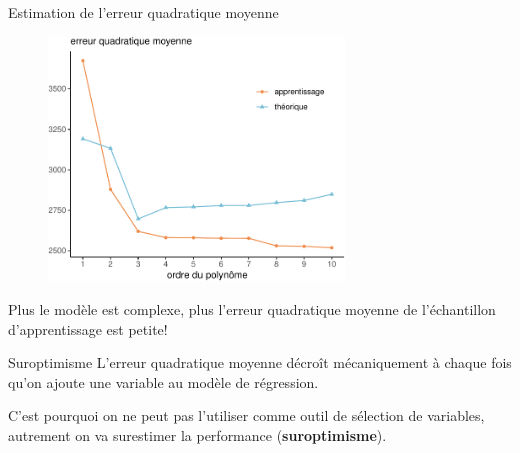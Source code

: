\documentclass[
  ignorenonframetext,
]{beamer}
\begin{document}
\begin{frame}{Estimation de l'erreur quadratique moyenne}
\protect\hypertarget{estimation-de-lerreur-quadratique-moyenne}{}
\begin{figure}

{\centering \includegraphics[width=0.7\textwidth,height=\textheight]{MATH60602-diapos4_files/figure-beamer/unnamed-chunk-7-1.pdf}

}

\end{figure}

Plus le modèle est complexe, plus l'erreur quadratique moyenne de
l'échantillon d'apprentissage est petite!
\end{frame}

\begin{frame}{Suroptimisme}
\protect\hypertarget{suroptimisme}{}
L'erreur quadratique moyenne décroît mécaniquement à chaque fois qu'on
ajoute une variable au modèle de régression.

C'est pourquoi on ne peut pas l'utiliser comme outil de sélection de
variables, autrement on va surestimer la performance
(\textbf{suroptimisme}).
\end{frame}
\end{document}
